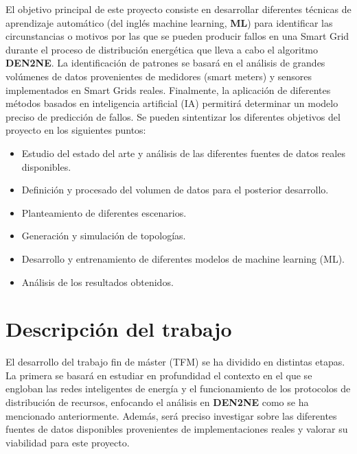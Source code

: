 El objetivo principal de este proyecto consiste en desarrollar diferentes técnicas de aprendizaje automático (del inglés machine learning, \textbf{ML}) para identificar las circunstancias o motivos por las que se pueden producir fallos en una Smart Grid durante el proceso de distribución energética que lleva a cabo el algoritmo \textbf{DEN2NE}. La identificación de patrones se basará en el análisis de grandes volúmenes de datos provenientes de medidores (smart meters) y sensores implementados en Smart Grids reales. Finalmente, la aplicación de diferentes métodos basados en inteligencia artificial (IA) permitirá determinar un modelo preciso de predicción de fallos. Se pueden sintentizar los diferentes objetivos del proyecto en los siguientes puntos:

\begin{itemize}
    \item Estudio del estado del arte y análisis de las diferentes fuentes de datos reales disponibles.
    \item Definición y procesado del volumen de datos para el posterior desarrollo. 
    \item Planteamiento de diferentes escenarios.
    \item Generación y simulación de topologías.
    \item Desarrollo y entrenamiento de diferentes modelos de machine learning (ML).
    \item Análisis de los resultados obtenidos.
\end{itemize}

\vspace{0.3cm}

\section{Descripción del trabajo}
\vspace{0.3cm}

El desarrollo del trabajo fin de máster (TFM) se ha dividido en distintas etapas. La primera se basará en estudiar en profundidad el contexto en el que se engloban las redes inteligentes de energía y el funcionamiento de los protocolos de distribución de recursos, enfocando el análisis en \textbf{DEN2NE} como se ha mencionado anteriormente. Además, será preciso investigar sobre las diferentes fuentes de datos disponibles provenientes de implementaciones reales y valorar su viabilidad para este proyecto. 

\vspace{0.3cm}

